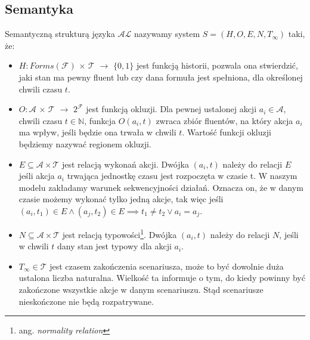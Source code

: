 \subsection{Semantyka}
\begin{definition}
Semantyczną strukturą języka $\mathcal{AL}$ nazywamy system $ S=(H,O,E,N,T_{\infty }) $ taki, że:
	\begin{itemize}
		\item $ H: Forms(\mathcal{F}) $ $\times$ $ \mathcal{T}$ $\longrightarrow$ $\{0,1\}$ jest funkcją historii,
		pozwala ona stwierdzić, jaki stan ma pewny fluent lub czy dana formuła jest spełniona, dla określonej chwili czasu $t$.
		\item $ O: \mathcal{A}$ $\times$ $ \mathcal{T}$ $\longrightarrow$ $2^{\mathcal{F}}$ jest funkcją okluzji.
		Dla pewnej ustalonej akcji $a_i \in \mathcal{A}$, chwili czasu $t\in\mathbb{N}$, funkcja $O(a_i,t) $ zwraca zbiór
		fluentów, na który akcja $a_i$ ma wpływ, jeśli będzie ona trwała w chwili $t$.
Wartość funkcji okluzji będziemy nazywać regionem okluzji.
		\item $E\subseteq \mathcal{A} \times \mathcal{T}$ jest relacją wykonań akcji. Dwójka $(a_i,t)$ należy do relacji
		$E$ jeśli akcja $a_i$ trwająca jednostkę czasu jest rozpoczęta w czasie t. W naszym modelu zakładamy warunek
		sekwencyjności działań. Oznacza on, że w danym czasie możemy wykonać tylko jedną akcje, tak więc jeśli
		$(a_i, t_1) \in E \land (a_j, t_2) \in E \implies t_1 \neq t_2 \lor a_i = a_j$.
		\item $N\subseteq \mathcal{A} \times \mathcal{T}$ jest relacją typowości\footnote{ang. \emph{normality relation}}.
		Dwójka $(a_i,t)$ należy do relacji $N$, jeśli w chwili $t$ dany stan jest typowy dla akcji $a_i$.
		\item $T_{\infty } \in \mathcal{T} $ jest czasem zakończenia scenariusza, może to być dowolnie duża ustalona liczba naturalna.
		Wielkość ta informuje o tym, do kiedy powinny być zakończone wszystkie akcje w danym scenariuszu.
		Stąd scenariusze nieskończone nie będą rozpatrywane.
	\end{itemize}
\end{definition}

